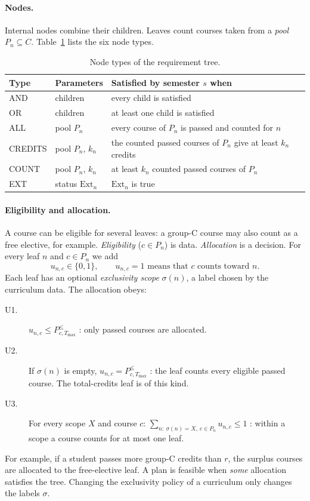 \documentclass[10pt,a4paper]{article}
\begin{document}
\paragraph{Nodes.}
Internal nodes combine their children. Leaves count courses taken from a
\emph{pool} $P_n\subseteq C$. Table~\ref{tab:nodes} lists the six node types.
 
\begin{table}[ht]
\centering
\small
\begin{tabular}{@{}lp{4.2cm}p{6.3cm}@{}}
\toprule
\textbf{Type} & \textbf{Parameters} & \textbf{Satisfied by semester $s$ when} \\
\midrule
AND & children & every child is satisfied \\
OR & children & at least one child is satisfied \\
ALL & pool $P_n$ & every course of $P_n$ is passed and counted for $n$ \\
CREDITS & pool $P_n$, $k_n$ & the counted passed courses of $P_n$ give at least $k_n$ credits \\
COUNT & pool $P_n$, $k_n$ & at least $k_n$ counted passed courses of $P_n$ \\
EXT & status $\mathrm{Ext}_n$ & $\mathrm{Ext}_n$ is true \\
\bottomrule
\end{tabular}
\caption{Node types of the requirement tree.}
\label{tab:nodes}
\end{table}
 
\paragraph{Eligibility and allocation.}
A course can be eligible for several leaves: a group-C course may also count
as a free elective, for example. \emph{Eligibility} ($c\in P_n$) is data.
\emph{Allocation} is a decision. For every leaf $n$ and $c\in P_n$ we add
\[
  u_{n,c}\in\{0,1\},\qquad u_{n,c}=1 \text{ means that } c \text{ counts toward } n.
\]
Each leaf has an optional \emph{exclusivity scope} $\sigma(n)$, a label chosen
by the curriculum data. The allocation obeys:
\begin{description}
  \item[U1.] $u_{n,c}\le P^{\le}_{c,T_{\max}}$ : only passed courses are allocated.
  \item[U2.] If $\sigma(n)$ is empty, $u_{n,c}=P^{\le}_{c,T_{\max}}$ : the leaf
        counts every eligible passed course. The total-credits leaf is of this kind.
  \item[U3.] For every scope $X$ and course $c$:
        $\sum_{n:\ \sigma(n)=X,\ c\in P_n} u_{n,c}\le 1$ : within a scope a
        course counts for at most one leaf.
\end{description}
For example, if a student passes more group-C credits than $r$, the surplus courses are
allocated to the free-elective leaf. A plan is feasible when \emph{some}
allocation satisfies the tree. Changing the exclusivity policy of a curriculum
only changes the labels $\sigma$.
 
\end{document}

